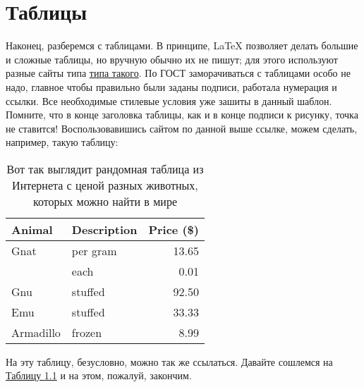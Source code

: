 \chapter{Таблицы}
\label{ch:tab}
    Наконец, разберемся с таблицами. В принципе, \LaTeX{} позволяет делать большие и сложные таблицы, но вручную обычно их не пишут; для этого используют разные сайты типа \href{https://www.tablesgenerator.com/}{типа такого}. По ГОСТ заморачиваться с таблицами особо не надо, главное чтобы правильно были заданы подписи, работала нумерация и ссылки. Все необходимые стилевые условия уже зашиты в данный шаблон. Помните, что в конце заголовка таблицы, как и в конце подписи к рисунку, точка не ставится! Воспользовавишись сайтом по данной выше ссылке, можем сделать, например, такую таблицу:
\begin{table}[ht]
\caption{Вот так выглядит рандомная таблица из Интернета с ценой разных животных, которых можно найти в мире}
\label{tab:t1}
\centering
\begin{tabular}{llr}
\hline
Animal    & Description & Price (\$) \\ \hline
Gnat      & per gram    & 13.65      \\
          & each        & 0.01       \\
Gnu       & stuffed     & 92.50      \\
Emu       & stuffed     & 33.33      \\
Armadillo & frozen      & 8.99       \\ \hline
\end{tabular}
\end{table}

На эту таблицу, безусловно, можно так же ссылаться. Давайте сошлемся на \hyperref[tab:t1]{Таблицу \ref*{tab:t1}} и на этом, пожалуй, закончим.

\endinput